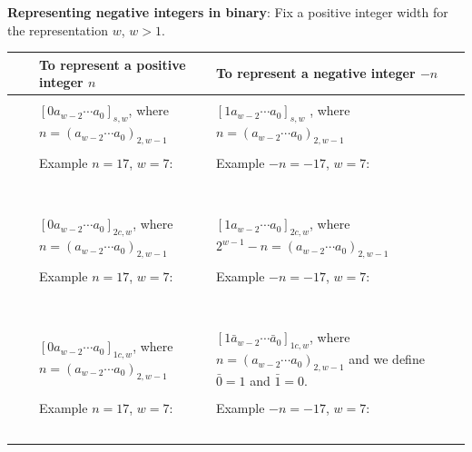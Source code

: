 \documentclass[12pt, oneside]{article}
\begin{document}
{\bf Representing negative integers in binary}: Fix a positive integer  width for the representation  $w$, $w >1$.

\begin{tabular}{|cc|p{3.4in}|p{3.7in}|}
\hline
& & To  represent a positive integer $n$ & To represent a negative integer $-n$\\
\hline
&& &  \\
&\parbox[t]{2mm}{} &
$[ 0a_{w-2} \cdots a_0]_{s,w}$, where $n =  (a_{w-2} \cdots a_0)_{2,w-1}$& 
$[1a_{w-2} \cdots a_0]_{s,w}$
, where $n =  (a_{w-2} \cdots a_0)_{2,w-1}$\\
&& & \\
&& Example $n=17$, $w=7$:  & Example $-n=-17$, $w=7$: \\
&& & \\
&& & \\
&& & \\
&& & \\
&& & \\
&& & \\
&& & \\
\hline
&&  &  \\
&\parbox[t]{2mm}{} &
$[0a_{w-2} \cdots a_0]_{2c,w}$, where $n =  (a_{w-2} \cdots a_0)_{2,w-1}$& $[1a_{w-2} \cdots a_0]_{2c,w}$, where $2^{w-1} - n =  (a_{w-2} \cdots a_0)_{2,w-1}$\\
&& & \\
&& Example $n=17$, $w=7$:  & Example $-n=-17$, $w=7$: \\
&& & \\
&& & \\
&& & \\
&& & \\
&& & \\
&& & \\
&& & \\
\hline
&&  &  \\
\parbox[t]{1.5mm}{} 
& \parbox[t]{2mm}{} &
$[0a_{w-2} \cdots a_0]_{1c,w}$, where $n =  (a_{w-2} \cdots a_0)_{2,w-1}$& $[1\bar{a}_{w-2} \cdots \bar{a}_0]_{1c,w}$, where $n =  (a_{w-2} \cdots a_0)_{2,w-1}$ and we define  $\bar{0} = 1$ and $\bar{1} = 0$.\\
&& & \\
&& Example $n=17$, $w=7$:  & Example $-n=-17$, $w=7$: \\
&& & \\
&& & \\
&& & \\
&& & \\
&& & \\
\hline
\end{tabular} \newpage
\end{document}
